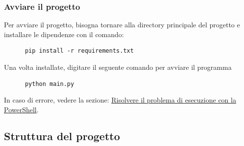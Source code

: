 \documentclass[12pt, letterpaper]{article}
\begin{document}
\subsubsection{Avviare il progetto}

Per avviare il progetto, bisogna tornare alla directory principale del progetto e installare
le dipendenze con il comando: \\

\begin{verbatim}
      pip install -r requirements.txt
\end{verbatim}

\noindent Una volta installate, digitare il seguente comando per avviare il programma

\begin{verbatim}
      python main.py
\end{verbatim}

\noindent In caso di errore, vedere la sezione:
\hyperref[sec:python-error]{Risolvere il problema di esecuzione con la PowerShell}.


\subsection{Struttura del progetto}
\end{document}
